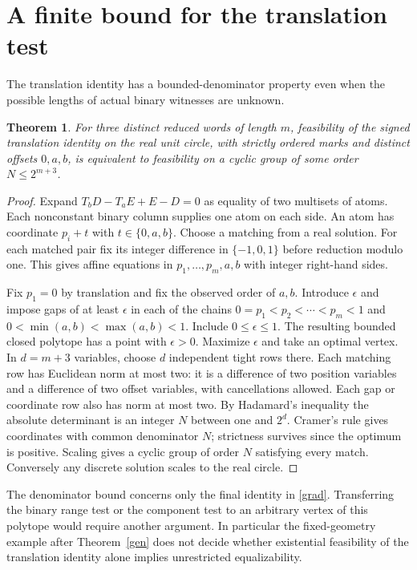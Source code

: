 \documentclass[11pt]{article}
\newtheorem{theorem}{Theorem}[section]
\begin{document}
\section{A finite bound for the translation test}
The translation identity has a bounded-denominator property even when the possible lengths of actual binary witnesses are unknown.
\begin{theorem}\label{den}
For three distinct reduced words of length $m$, feasibility of the signed translation identity on the real unit circle, with strictly ordered marks and distinct offsets $0,a,b$, is equivalent to feasibility on a cyclic group of some order $N\le2^{m+3}$.
\end{theorem}
\begin{proof}
Expand $T_bD-T_aE+E-D=0$ as equality of two multisets of atoms. Each nonconstant binary column supplies one atom on each side. An atom has coordinate $p_i+t$ with $t\in\{0,a,b\}$. Choose a matching from a real solution. For each matched pair fix its integer difference in $\{-1,0,1\}$ before reduction modulo one. This gives affine equations in $p_1,\ldots,p_m,a,b$ with integer right-hand sides.

Fix $p_1=0$ by translation and fix the observed order of $a,b$. Introduce $\epsilon$ and impose gaps of at least $\epsilon$ in each of the chains $0=p_1<p_2<\cdots<p_m<1$ and $0<\min(a,b)<\max(a,b)<1$. Include $0\le\epsilon\le1$. The resulting bounded closed polytope has a point with $\epsilon>0$. Maximize $\epsilon$ and take an optimal vertex. In $d=m+3$ variables, choose $d$ independent tight rows there. Each matching row has Euclidean norm at most two: it is a difference of two position variables and a difference of two offset variables, with cancellations allowed. Each gap or coordinate row also has norm at most two. By Hadamard's inequality the absolute determinant is an integer $N$ between one and $2^d$. Cramer's rule gives coordinates with common denominator $N$; strictness survives since the optimum is positive. Scaling gives a cyclic group of order $N$ satisfying every match. Conversely any discrete solution scales to the real circle.
\end{proof}
The denominator bound concerns only the final identity in \eqref{grad}. Transferring the binary range test or the component test to an arbitrary vertex of this polytope would require another argument. In particular the fixed-geometry example after Theorem~\ref{gen} does not decide whether existential feasibility of the translation identity alone implies unrestricted equalizability.
\end{document}
